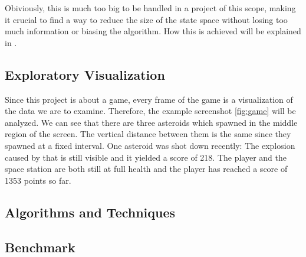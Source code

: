 \documentclass[a4paper,10pt]{article}
\begin{document}
Obiviously, this is much too big to be handled in a project of this scope, making it crucial to find a way to reduce the size of the state space without losing too much information or biasing the algorithm.
How this is achieved will be explained in .


\subsection{Exploratory Visualization}

Since this project is about a game, every frame of the game is a visualization of the data we are to examine.
Therefore, the example screenshot \ref{fig:game} will be analyzed.
We can see that there are three asteroids which spawned in the middle region of the screen.
The vertical distance between them is the same since they spawned at a fixed interval.
One asteroid was shot down recently: The explosion caused by that is still visible and it yielded a score of 218.
The player and the space station are both still at full health and the player has reached a score of 1353 points so far.
\subsection{Algorithms and Techniques}

\subsection{Benchmark}
\end{document}
